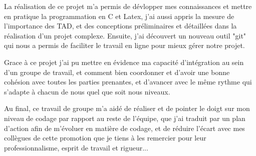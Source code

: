 %
  La réalisation de ce projet m'a permis de dévlopper mes connaissances et mettre en pratique la programmation en C et Latex, j'ai aussi appris la mesure de l'importance des TAD, et des conceptions préliminaires et détaillées dans la réalisation d'un projet complexe. Ensuite, j'ai découvert un nouveau outil "git" qui nous a permis de faciliter le travail en ligne pour mieux gérer notre projet.
 
  Grace à ce projet j'ai pu mettre en évidence ma capacité d'intégration au sein d'un groupe de travail, et comment bien coordonner et d'avoir une bonne cohésion avec toutes les parties prenantes, et d'avancer avec le même rythme qui s'adapte à chacun de nous quel que soit nous niveaux.

  Au final, ce travail de groupe m'a aidé de réaliser et de pointer le doigt sur mon niveau de codage par rapport au reste de l'équipe, que j'ai traduit par un plan d'action afin de m'évoluer en matière de codage, et de réduire l'écart avec mes collègues de cette promotion que je tiens à les remercier pour leur professionnalisme, esprit de travail et rigueur...
  
